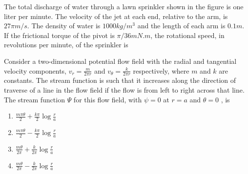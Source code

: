     \item The total discharge of water through a lawn sprinkler shown in the figure is one liter per minute. The velocity of the jet at each end, relative to the arm, is $27\pi m/s$. The density of water is $1000 kg/m^3$ and the length of each arm is $0.1 m$. If the frictional torque of the pivot is $\pi/36 mN.m$, the rotational speed, in revolutions per minute, of the sprinkler is
    \begin{figure}[H]
    \centering

    \label{fig:my_label}
    \end{figure}

    \item Consider a two-dimensional potential flow field with the radial and tangential velocity components, $v_{r} = \frac{m}{2\pi r}$ and $v_{\theta} = \frac{k}{2\pi r}$ respectively, where $m$ and $k$ are constants. The stream function is such that it increases along the direction of traverse of a line in the flow field if the flow is from left to right across that line. The stream function $\Psi$ for this flow field, with $\psi = 0$ at  $r = a$ and $\theta = 0$ , is
    \begin{multicols}{2}
        \begin{enumerate}
            \item $\frac{m \pi \theta}{2} + \frac{k \pi}{2} \log{\frac{r}{a}}$
            \item $\frac{m \pi \theta}{2} - \frac{k \pi}{2} \log{\frac{r}{a}}$
            \item $\frac{m  \theta}{2\pi} + \frac{k }{2\pi} \log{\frac{r}{a}}$
            \item $\frac{m  \theta}{2\pi} - \frac{k }{2\pi} \log{\frac{r}{a}}$
        \end{enumerate}
        
    \end{multicols}


